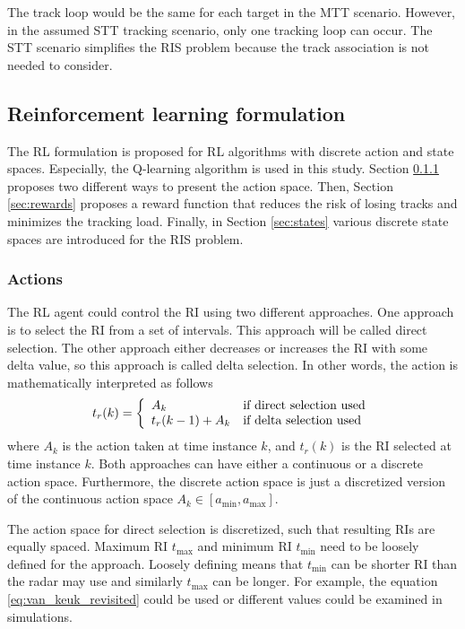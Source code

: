 \documentclass[english, 12pt, a4paper, elec, utf8, a-1b, online]{aaltothesis}
\newcommand{\amax}{a_\text{max}}
\newcommand{\amin}{a_\text{min}}
\newcommand{\tmax}{t_\text{max}}
\newcommand{\tmin}{t_\text{min}}
\newcommand{\ri}{t_r}
\begin{document}
The track loop would be the same for each target in the MTT scenario. 
However, in the assumed STT tracking scenario, only one tracking loop can occur. 
The STT scenario simplifies the RIS problem because the track association is not needed to consider.


\subsection{Reinforcement learning formulation}\label{sec:RL_formulation}

The RL formulation is proposed for RL algorithms with discrete action and state spaces. 
Especially, the Q-learning algorithm is used in this study. 
Section \ref{sec:actions} proposes two different ways to present the action space.
Then, Section \ref{sec:rewards} proposes a reward function that reduces the risk of losing tracks and minimizes the tracking load. 
Finally, in Section \ref{sec:states} various discrete state spaces are introduced for the RIS problem.

\subsubsection{Actions} \label{sec:actions}

The RL agent could control the RI using two different approaches.
One approach is to select the RI from a set of intervals.
This approach will be called direct selection.
The other approach either decreases or increases the RI with some delta value, so this approach is called delta selection.
In other words, the action is mathematically interpreted as follows
\begin{equation}
    \ri(k) = \left\{
        \begin{array}{l l}
            A_k & \text{if direct selection used} \\
            \ri(k-1) + A_k &  \text{if delta selection used}
        \end{array}\right.
\end{equation}
where $A_k$ is the action taken at time instance $k$, and $\ri(k)$ is the RI selected at time instance $k$.
Both approaches can have either a continuous or a discrete action space.
Furthermore, the discrete action space is just a discretized version of the continuous action space $A_k \in [\amin, \amax]$.

The action space for direct selection is discretized, such that resulting RIs are equally spaced.
Maximum RI $\tmax$ and minimum RI $\tmin$ need to be loosely defined for the approach. 
Loosely defining means that $\tmin$ can be shorter RI than the radar may use and similarly $\tmax$ can be longer.
For example, the equation \eqref{eq:van_keuk_revisited} could be used or different values could be examined in simulations. 
\end{document}

